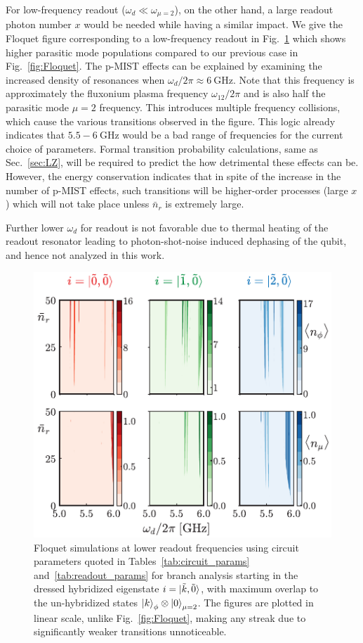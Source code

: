 \documentclass[%
reprint,
superscriptaddress,
 amsmath,amssymb,
 aps,
 prx,
longbibliography,
floatfix,
]{revtex4-2}
\begin{document}
For low-frequency readout ($\omega_d \ll \omega_{\mu = 2}$), on the other hand, a large readout photon number $x$ would be needed while having a similar impact. We give the Floquet figure corresponding to a low-frequency readout in Fig.~\ref{fig:Flo_low} which shows higher parasitic mode populations compared to our previous case in Fig.~\ref{fig:Floquet}. The p-MIST effects can be explained by examining the increased density of resonances when $\omega_d/2\pi \approx 6 \ \mathrm{GHz}$. Note that this frequency is approximately the fluxonium plasma frequency $\omega_{12}/2\pi$ and is also half the parasitic mode $\mu=2$ frequency. This introduces multiple frequency collisions, which cause the various transitions observed in the figure. This logic already indicates that $5.5-6 \ \mathrm{GHz}$ would be a bad range of frequencies for the current choice of parameters. Formal transition probability calculations, same as Sec.~\ref{sec:LZ}, will be required to predict the how detrimental these effects can be. However, the energy conservation indicates that in spite of the increase in the number of p-MIST effects, such transitions will be higher-order processes (large $x$) which will not take place unless $\bar n_r$ is extremely large.


Further lower $\omega_d$ for readout is not favorable due to thermal heating of the readout resonator leading to photon-shot-noise induced dephasing of the qubit, and hence not analyzed in this work.  

\begin{figure}[t]
    \centering
    \includegraphics[width=\linewidth]{Figures/Floquet_low.pdf}
    \caption{Floquet simulations at lower readout frequencies using circuit parameters quoted in Tables~\ref{tab:circuit_params} and~\ref{tab:readout_params} for branch analysis starting in the dressed hybridized eigenstate $i=\ket{\tilde{k},\tilde{0}}$, with maximum overlap to the un-hybridized states $\ket{k}_\phi\otimes\ket{0}_{\mu=2}$. The figures are plotted in linear scale, unlike Fig.~\ref{fig:Floquet}, making any streak due to significantly weaker transitions unnoticeable.}
    \label{fig:Flo_low}
\end{figure}
\end{document}
